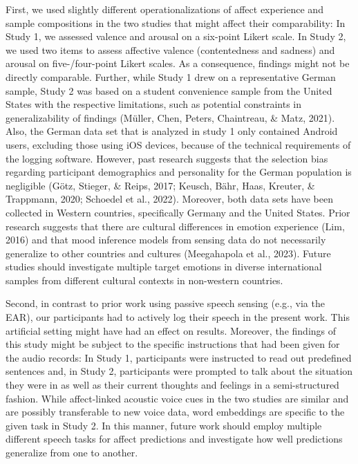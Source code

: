 \documentclass[
  man,floatsintext]{apa6}
\begin{document}
First, we used slightly different operationalizations of affect experience and sample compositions in the two studies that might affect their comparability: In Study 1, we assessed valence and arousal on a six-point Likert scale. In Study 2, we used two items to assess affective valence (contentedness and sadness) and arousal on five-/four-point Likert scales. As a consequence, findings might not be directly comparable. Further, while Study 1 drew on a representative German sample, Study 2 was based on a student convenience sample from the United States with the respective limitations, such as potential constraints in generalizability of findings (Müller, Chen, Peters, Chaintreau, \& Matz, 2021). Also, the German data set that is analyzed in study 1 only contained Android users, excluding those using iOS devices, because of the technical requirements of the logging software. However, past research suggests that the selection bias regarding participant demographics and personality for the German population is negligible (Götz, Stieger, \& Reips, 2017; Keusch, Bähr, Haas, Kreuter, \& Trappmann, 2020; Schoedel et al., 2022). Moreover, both data sets have been collected in Western countries, specifically Germany and the United States. Prior research suggests that there are cultural differences in emotion experience (Lim, 2016) and that mood inference models from sensing data do not necessarily generalize to other countries and cultures (Meegahapola et al., 2023). Future studies should investigate multiple target emotions in diverse international samples from different cultural contexts in non-western countries.

Second, in contrast to prior work using passive speech sensing (e.g., via the EAR), our participants had to actively log their speech in the present work. This artificial setting might have had an effect on results. Moreover, the findings of this study might be subject to the specific instructions that had been given for the audio records: In Study 1, participants were instructed to read out predefined sentences and, in Study 2, participants were prompted to talk about the situation they were in as well as their current thoughts and feelings in a semi-structured fashion. While affect-linked acoustic voice cues in the two studies are similar and are possibly transferable to new voice data, word embeddings are specific to the given task in Study 2. In this manner, future work should employ multiple different speech tasks for affect predictions and investigate how well predictions generalize from one to another.
\end{document}
